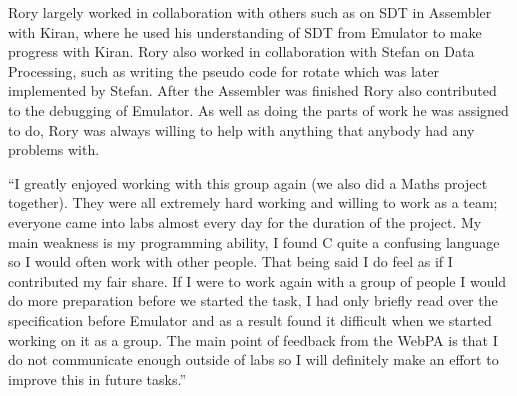 \documentclass[a4wide, 10pt]{article}
\begin{document}
Rory largely worked in collaboration with others such as on SDT in Assembler with Kiran, where he used his understanding of SDT from Emulator to make progress with Kiran. Rory also worked in collaboration with Stefan on Data Processing, such as writing the pseudo code for rotate which was later implemented by Stefan. After the Assembler was finished Rory also contributed to the debugging of Emulator. As well as doing the parts of work he was assigned to do, Rory was always willing to help with anything that anybody had any problems with.

\textquotedblleft I greatly enjoyed working with this group again (we also did a Maths project together). They were all extremely hard working and willing to work as a team; everyone came into labs almost every day for the duration of the project. My main weakness is my programming ability, I found C quite a confusing language so I would often work with other people. That being said I do feel as if I contributed my fair share. If I were to work again with a group of people I would do more preparation before we started the task, I had only briefly read over the specification before Emulator and as a result found it difficult when we started working on it as a group. The main point of feedback from the WebPA is that I do not communicate enough outside of labs so I will definitely make an effort to improve this in future tasks.\textquotedblright
\end{document}
